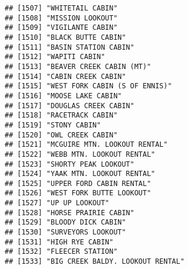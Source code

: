 \documentclass[
]{article}
\begin{document}
\begin{verbatim}
## [1507] "WHITETAIL CABIN"                                                                     
## [1508] "MISSION LOOKOUT"                                                                     
## [1509] "VIGILANTE CABIN"                                                                     
## [1510] "BLACK BUTTE CABIN"                                                                   
## [1511] "BASIN STATION CABIN"                                                                 
## [1512] "WAPITI CABIN"                                                                        
## [1513] "BEAVER CREEK CABIN (MT)"                                                             
## [1514] "CABIN CREEK CABIN"                                                                   
## [1515] "WEST FORK CABIN (S OF ENNIS)"                                                        
## [1516] "MOOSE LAKE CABIN"                                                                    
## [1517] "DOUGLAS CREEK CABIN"                                                                 
## [1518] "RACETRACK CABIN"                                                                     
## [1519] "STONY CABIN"                                                                         
## [1520] "OWL CREEK CABIN"                                                                     
## [1521] "MCGUIRE MTN. LOOKOUT RENTAL"                                                         
## [1522] "WEBB MTN. LOOKOUT RENTAL"                                                            
## [1523] "SHORTY PEAK LOOKOUT"                                                                 
## [1524] "YAAK MTN. LOOKOUT RENTAL"                                                            
## [1525] "UPPER FORD CABIN RENTAL"                                                             
## [1526] "WEST FORK BUTTE LOOKOUT"                                                             
## [1527] "UP UP LOOKOUT"                                                                       
## [1528] "HORSE PRAIRIE CABIN"                                                                 
## [1529] "BLOODY DICK CABIN"                                                                   
## [1530] "SURVEYORS LOOKOUT"                                                                   
## [1531] "HIGH RYE CABIN"                                                                      
## [1532] "FLEECER STATION"                                                                     
## [1533] "BIG CREEK BALDY. LOOKOUT RENTAL"                                                     

\end{verbatim}
\end{document}
